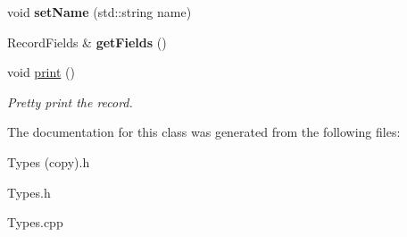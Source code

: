 \begin{DoxyCompactItemize}
\mbox{\label{classspan_1_1ir_1_1types_1_1Record_a1d502388eeab8e63bc97470c5cbe466b}} 
void {\bfseries set\+Name} (std\+::string name)
\item 
\mbox{\label{classspan_1_1ir_1_1types_1_1Record_a6ed272c0e6dea686e9a4eb4f0636beb6}} 
Record\+Fields \& {\bfseries get\+Fields} ()
\item 
\mbox{\label{classspan_1_1ir_1_1types_1_1Record_aa0225adfc21a89124d6ece84395cb1a1}} 
void \hyperlink{classspan_1_1ir_1_1types_1_1Record_aa0225adfc21a89124d6ece84395cb1a1}{print} ()
\begin{DoxyCompactList}\small\item\em Pretty print the record. \end{DoxyCompactList}\end{DoxyCompactItemize}


The documentation for this class was generated from the following files\+:\begin{DoxyCompactItemize}
\item 
Types (copy).\+h\item 
Types.\+h\item 
Types.\+cpp\end{DoxyCompactItemize}
